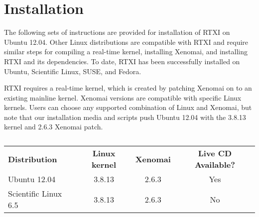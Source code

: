 
\section{Installation}

The following sets of instructions are provided for installation of RTXI on  Ubuntu 12.04. Other Linux distributions are compatible with RTXI and require similar steps for compiling a real-time kernel, installing Xenomai, and installing RTXI and its dependencies. To date, RTXI has been successfully installed on Ubuntu, Scientific Linux, SUSE, and Fedora. 

RTXI requires a real-time kernel, which is created by patching Xenomai on to an existing mainline kernel. Xenomai versions are compatible with specific Linux kernels. Users can choose any supported combination of Linux and Xenomai, but note that our installation media and scripts push Ubuntu 12.04 with the 3.8.13 kernel and 2.6.3 Xenomai patch.

\begin{table}[htdp]
\label{configs}
\begin{center}
\vspace{.5cm}
\begin{tabular}{lccc}
\textbf{Distribution} & \textbf{Linux kernel} & \textbf{Xenomai} & \textbf{Live CD Available?}\\
Ubuntu 12.04 & 3.8.13 & 2.6.3 & Yes \\
Scientific Linux 6.5 & 3.8.13 & 2.6.3 & No\\
\end{tabular}
\end{center}
\caption{}
\end{table}%